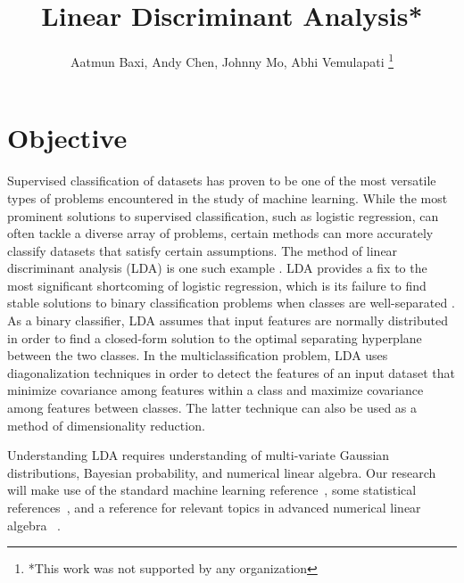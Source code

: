 \documentclass[letterpaper, 10 pt, conference]{ieeeconf}  %
\title{\LARGE \bf
Linear Discriminant Analysis*
}
\author{Aatmun Baxi, Andy Chen, Johnny Mo, Abhi Vemulapati%
\thanks{*This work was not supported by any organization}%
}
\begin{document}
\maketitle
\thispagestyle{empty}
\pagestyle{empty}






\section{Objective}
Supervised classification of datasets has proven to be one of the most versatile types of problems encountered in the study of machine learning. While the most prominent solutions to supervised classification, such as logistic regression, can often tackle a diverse array of problems, certain methods can more accurately classify datasets that satisfy certain assumptions. The method of linear discriminant analysis (LDA) is one such example \cite{friedman2001elements}. LDA provides a fix to the most significant shortcoming of logistic regression, which is its failure to find stable solutions to binary classification problems when classes are well-separated \cite{bishop2006pattern}. As a binary classifier, LDA assumes that input features are normally distributed in order to find a closed-form solution to the optimal separating hyperplane between the two classes. In the multiclassification problem, LDA uses diagonalization techniques in order to detect the features of an input dataset that minimize covariance among features within a class and maximize covariance among features between classes. The latter technique can also be used as a method of dimensionality reduction.

Understanding LDA requires understanding of multi-variate Gaussian distributions, Bayesian probability, and numerical linear algebra.  Our research will make use of the standard machine learning reference~\cite{bishop2006pattern}, some statistical references~\cite{friedman2001elements,james2013introduction}, and a reference for relevant topics in advanced numerical linear algebra ~\cite{trefethen1997numerical}.
\end{document}
